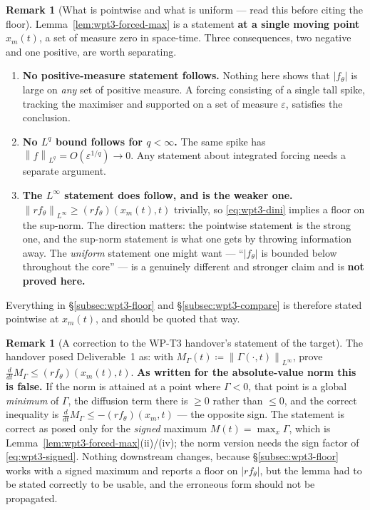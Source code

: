 \documentclass[11pt]{article}
\theoremstyle{definition}
\newtheorem{remark}[theorem]{Remark}
\theoremstyle{remark}
\newcommand{\norm}[1]{\left\|#1\right\|}
\newcommand{\abs}[1]{\left|#1\right|}
\newcommand{\eps}{\varepsilon}
\begin{document}
\begin{remark}[What is pointwise and what is uniform --- read this before
  citing the floor]\label{rem:wpt3-pointwise}
  Lemma~\ref{lem:wpt3-forced-max} is a statement \textbf{at a single moving
  point} $x_m(t)$, a set of measure zero in space-time. Three consequences,
  two negative and one positive, are worth separating.
  \begin{enumerate}[label=(\alph*),leftmargin=2.2em]
    \item \textbf{No positive-measure statement follows.} Nothing here shows
      that $\abs{f_\theta}$ is large on \emph{any} set of positive measure. A
      forcing consisting of a single tall spike, tracking the maximiser and
      supported on a set of measure $\eps$, satisfies the conclusion.
    \item \textbf{No $L^q$ bound follows for $q<\infty$.} The same spike has
      $\norm{f}_{L^q}=O(\eps^{1/q})\to0$. Any statement about integrated
      forcing needs a separate argument.
    \item \textbf{The $L^\infty$ statement does follow, and is the weaker
      one.} $\norm{rf_\theta}_{L^\infty}\geq(rf_\theta)(x_m(t),t)$ trivially,
      so \eqref{eq:wpt3-dini} implies a floor on the sup-norm. The direction
      matters: the pointwise statement is the strong one, and the sup-norm
      statement is what one gets by throwing information away. The
      \emph{uniform} statement one might want --- ``$\abs{f_\theta}$ is
      bounded below throughout the core'' --- is a genuinely different and
      stronger claim and is \textbf{not proved here.}
  \end{enumerate}
  Everything in \S\ref{subsec:wpt3-floor} and \S\ref{subsec:wpt3-compare} is
  therefore stated pointwise at $x_m(t)$, and should be quoted that way.
\end{remark}

\begin{remark}[A correction to the WP-T3 handover's statement of the target]
  \label{rem:wpt3-handover-sign}
  The handover posed Deliverable~1 as: with
  $M_\Gamma(t)\coloneqq\norm{\Gamma(\cdot,t)}_{L^\infty}$, prove
  $\frac{d}{dt}M_\Gamma\leq(rf_\theta)(x_m(t),t)$. \textbf{As written for the
  absolute-value norm this is false.} If the norm is attained at a point
  where $\Gamma<0$, that point is a global \emph{minimum} of $\Gamma$, the
  diffusion term there is $\geq0$ rather than $\leq0$, and the correct
  inequality is $\frac{d}{dt}M_\Gamma\leq-(rf_\theta)(x_m,t)$ --- the
  opposite sign. The statement is correct as posed only for the
  \emph{signed} maximum $M(t)=\max_x\Gamma$, which is
  Lemma~\ref{lem:wpt3-forced-max}(ii)/(iv); the norm version needs the sign
  factor of \eqref{eq:wpt3-signed}. Nothing downstream changes, because
  \S\ref{subsec:wpt3-floor} works with a signed maximum and reports a floor
  on $\abs{rf_\theta}$, but the lemma had to be stated correctly to be
  usable, and the erroneous form should not be propagated.
\end{remark}
\end{document}
